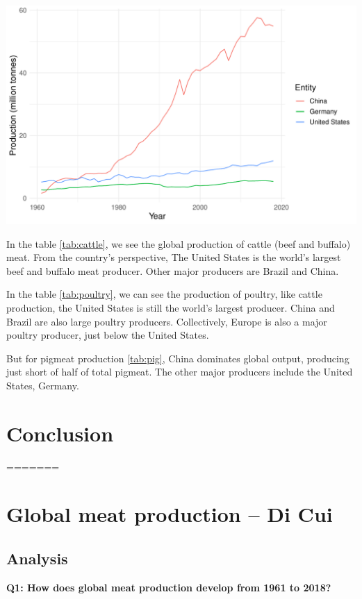 \documentclass[11pt,a4paper,]{article}
\begin{document}
\includegraphics{report_files/figure-latex/pig-1.pdf}

In the table \ref{tab:cattle}, we see the global production of cattle (beef and buffalo) meat. From the country's perspective, The United States is the world's largest beef and buffalo meat producer. Other major producers are Brazil and China.

In the table \ref{tab:poultry}, we can see the production of poultry, like cattle production, the United States is still the world's largest producer. China and Brazil are also large poultry producers. Collectively, Europe is also a major poultry producer, just below the United States.

But for pigmeat production \ref{tab:pig}, China dominates global output, producing just short of half of total pigmeat. The other major producers include the United States, Germany.
\clearpage

\hypertarget{conclusion}{%
\section{Conclusion}\label{conclusion}}

=======
\section*{Global meat production -- Di Cui}

\subsection*{Analysis}

\textbf{Q1: How does global meat production develop from 1961 to 2018?}
\end{document}
